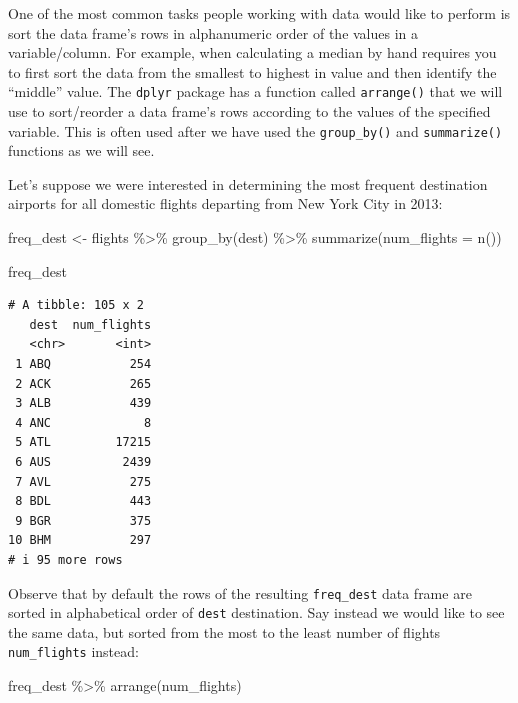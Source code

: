 \documentclass[
  letterpaper,
  DIV=11,
  numbers=noendperiod]{scrreprt}
\newenvironment{Shaded}{\begin{snugshade}}{\end{snugshade}}
\newcommand{\AttributeTok}[1]{\textcolor[rgb]{0.40,0.45,0.13}{#1}}
\newcommand{\FunctionTok}[1]{\textcolor[rgb]{0.28,0.35,0.67}{#1}}
\newcommand{\NormalTok}[1]{\textcolor[rgb]{0.00,0.23,0.31}{#1}}
\newcommand{\OtherTok}[1]{\textcolor[rgb]{0.00,0.23,0.31}{#1}}
\newcommand{\SpecialCharTok}[1]{\textcolor[rgb]{0.37,0.37,0.37}{#1}}
\theoremstyle{definition}
\theoremstyle{remark}
\begin{document}
One of the most common tasks people working with data would like to
perform is sort the data frame's rows in alphanumeric order of the
values in a variable/column. For example, when calculating a median by
hand requires you to first sort the data from the smallest to highest in
value and then identify the ``middle'' value. The \texttt{dplyr} package
has a function called \texttt{arrange()} that we will use to
sort/reorder a data frame's rows according to the values of the
specified variable. This is often used after we have used the
\texttt{group\_by()} and \texttt{summarize()} functions as we will see.

Let's suppose we were interested in determining the most frequent
destination airports for all domestic flights departing from New York
City in 2013:

\begin{Shaded}
\begin{Highlighting}[]
\NormalTok{freq\_dest }\OtherTok{\textless{}{-}}\NormalTok{ flights }\SpecialCharTok{\%\textgreater{}\%} 
  \FunctionTok{group\_by}\NormalTok{(dest) }\SpecialCharTok{\%\textgreater{}\%} 
  \FunctionTok{summarize}\NormalTok{(}\AttributeTok{num\_flights =} \FunctionTok{n}\NormalTok{())}

\NormalTok{freq\_dest}
\end{Highlighting}
\end{Shaded}

\begin{verbatim}
# A tibble: 105 x 2
   dest  num_flights
   <chr>       <int>
 1 ABQ           254
 2 ACK           265
 3 ALB           439
 4 ANC             8
 5 ATL         17215
 6 AUS          2439
 7 AVL           275
 8 BDL           443
 9 BGR           375
10 BHM           297
# i 95 more rows
\end{verbatim}

Observe that by default the rows of the resulting \texttt{freq\_dest}
data frame are sorted in alphabetical order of \texttt{dest}
destination. Say instead we would like to see the same data, but sorted
from the most to the least number of flights \texttt{num\_flights}
instead:

\begin{Shaded}
\begin{Highlighting}[]
\NormalTok{freq\_dest }\SpecialCharTok{\%\textgreater{}\%} 
  \FunctionTok{arrange}\NormalTok{(num\_flights)}
\end{Highlighting}
\end{Shaded}
\end{document}
